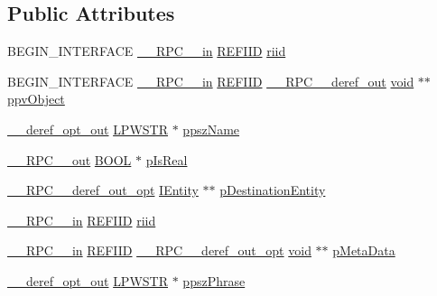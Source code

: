 \subsection*{Public Attributes}
\begin{DoxyCompactItemize}
\item 
B\+E\+G\+I\+N\+\_\+\+I\+N\+T\+E\+R\+F\+A\+CE \hyperlink{rpcsal_8h_a20b7f6da600a05c8b541659f14f7f0e6}{\+\_\+\+\_\+\+R\+P\+C\+\_\+\+\_\+in} \hyperlink{px__win__ds_8c_a80ec49c8ae61e234197d5071d2df497d}{R\+E\+F\+I\+ID} \hyperlink{struct_i_relationship_vtbl_a9be27328fbd02cda1564ce200c7fe5ea}{riid}
\item 
B\+E\+G\+I\+N\+\_\+\+I\+N\+T\+E\+R\+F\+A\+CE \hyperlink{rpcsal_8h_a20b7f6da600a05c8b541659f14f7f0e6}{\+\_\+\+\_\+\+R\+P\+C\+\_\+\+\_\+in} \hyperlink{px__win__ds_8c_a80ec49c8ae61e234197d5071d2df497d}{R\+E\+F\+I\+ID} \hyperlink{rpcsal_8h_a23bc188526f10656f9c79d950f6c3192}{\+\_\+\+\_\+\+R\+P\+C\+\_\+\+\_\+deref\+\_\+out} \hyperlink{sound_8c_ae35f5844602719cf66324f4de2a658b3}{void} $\ast$$\ast$ \hyperlink{struct_i_relationship_vtbl_abfc792c52dc14b2e4339dba8a6db788f}{ppv\+Object}
\item 
\hyperlink{sal_8h_aca83a5a174d598aaeea78f024e4af103}{\+\_\+\+\_\+deref\+\_\+opt\+\_\+out} \hyperlink{mapinls_8h_acc28f72b93422cfd63a60e5a102a77b1}{L\+P\+W\+S\+TR} $\ast$ \hyperlink{struct_i_relationship_vtbl_ad4cb8bc7dcba6d65e9f2a9f427870197}{ppsz\+Name}
\item 
\hyperlink{rpcsal_8h_aa518a2c78d44d75f3685c32c455c5ed8}{\+\_\+\+\_\+\+R\+P\+C\+\_\+\+\_\+out} \hyperlink{nfilterkit_8h_a3be13892ae7076009afcf121347dd319}{B\+O\+OL} $\ast$ \hyperlink{struct_i_relationship_vtbl_aa608b834a180c0b59262d561ced4b46a}{p\+Is\+Real}
\item 
\hyperlink{rpcsal_8h_ab29e89ceb0eb0b075c6f6299b0de6a21}{\+\_\+\+\_\+\+R\+P\+C\+\_\+\+\_\+deref\+\_\+out\+\_\+opt} \hyperlink{structuredquery_8h_a9dd08456b6bfe208b5aa2ea5c533b490}{I\+Entity} $\ast$$\ast$ \hyperlink{struct_i_relationship_vtbl_a7f111304052a11804343994cba12c0d9}{p\+Destination\+Entity}
\item 
\hyperlink{rpcsal_8h_a20b7f6da600a05c8b541659f14f7f0e6}{\+\_\+\+\_\+\+R\+P\+C\+\_\+\+\_\+in} \hyperlink{px__win__ds_8c_a80ec49c8ae61e234197d5071d2df497d}{R\+E\+F\+I\+ID} \hyperlink{struct_i_relationship_vtbl_a7d2a5578ff5bed3286887c4654fd527e}{riid}
\item 
\hyperlink{rpcsal_8h_a20b7f6da600a05c8b541659f14f7f0e6}{\+\_\+\+\_\+\+R\+P\+C\+\_\+\+\_\+in} \hyperlink{px__win__ds_8c_a80ec49c8ae61e234197d5071d2df497d}{R\+E\+F\+I\+ID} \hyperlink{rpcsal_8h_ab29e89ceb0eb0b075c6f6299b0de6a21}{\+\_\+\+\_\+\+R\+P\+C\+\_\+\+\_\+deref\+\_\+out\+\_\+opt} \hyperlink{sound_8c_ae35f5844602719cf66324f4de2a658b3}{void} $\ast$$\ast$ \hyperlink{struct_i_relationship_vtbl_a8039e13a6d31b68141550c5e00475c49}{p\+Meta\+Data}
\item 
\hyperlink{sal_8h_aca83a5a174d598aaeea78f024e4af103}{\+\_\+\+\_\+deref\+\_\+opt\+\_\+out} \hyperlink{mapinls_8h_acc28f72b93422cfd63a60e5a102a77b1}{L\+P\+W\+S\+TR} $\ast$ \hyperlink{struct_i_relationship_vtbl_a8601d3a9d2d82644a746f344e641e3a6}{ppsz\+Phrase}
\end{DoxyCompactItemize}


